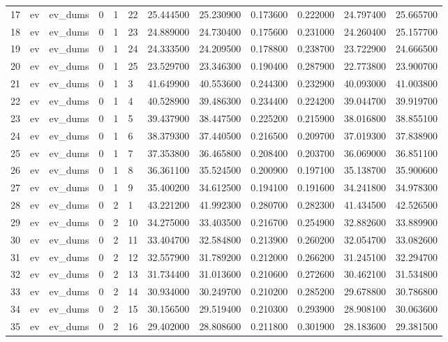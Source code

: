 \begin{tabular}{llllllrrrrrr}
17 & ev & ev_dums & 0 & 1 & 22 & 25.444500 & 25.230900 & 0.173600 & 0.222000 & 24.797400 & 25.665700 \\
18 & ev & ev_dums & 0 & 1 & 23 & 24.889000 & 24.730400 & 0.175600 & 0.231000 & 24.260400 & 25.157700 \\
19 & ev & ev_dums & 0 & 1 & 24 & 24.333500 & 24.209500 & 0.178800 & 0.238700 & 23.722900 & 24.666500 \\
20 & ev & ev_dums & 0 & 1 & 25 & 23.529700 & 23.346300 & 0.190400 & 0.287900 & 22.773800 & 23.900700 \\
21 & ev & ev_dums & 0 & 1 & 3 & 41.649900 & 40.553600 & 0.244300 & 0.232900 & 40.093000 & 41.003800 \\
22 & ev & ev_dums & 0 & 1 & 4 & 40.528900 & 39.486300 & 0.234400 & 0.224200 & 39.044700 & 39.919700 \\
23 & ev & ev_dums & 0 & 1 & 5 & 39.437900 & 38.447500 & 0.225200 & 0.215900 & 38.016800 & 38.855100 \\
24 & ev & ev_dums & 0 & 1 & 6 & 38.379300 & 37.440500 & 0.216500 & 0.209700 & 37.019300 & 37.838900 \\
25 & ev & ev_dums & 0 & 1 & 7 & 37.353800 & 36.465800 & 0.208400 & 0.203700 & 36.069000 & 36.851100 \\
26 & ev & ev_dums & 0 & 1 & 8 & 36.361100 & 35.524500 & 0.200900 & 0.197100 & 35.138700 & 35.900600 \\
27 & ev & ev_dums & 0 & 1 & 9 & 35.400200 & 34.612500 & 0.194100 & 0.191600 & 34.241800 & 34.978300 \\
28 & ev & ev_dums & 0 & 2 & 1 & 43.221200 & 41.992300 & 0.280700 & 0.282300 & 41.434500 & 42.526500 \\
29 & ev & ev_dums & 0 & 2 & 10 & 34.275000 & 33.403500 & 0.216700 & 0.254900 & 32.882600 & 33.889900 \\
30 & ev & ev_dums & 0 & 2 & 11 & 33.404700 & 32.584800 & 0.213900 & 0.260200 & 32.054700 & 33.082600 \\
31 & ev & ev_dums & 0 & 2 & 12 & 32.557900 & 31.789200 & 0.212000 & 0.266200 & 31.245100 & 32.294700 \\
32 & ev & ev_dums & 0 & 2 & 13 & 31.734400 & 31.013600 & 0.210600 & 0.272600 & 30.462100 & 31.534800 \\
33 & ev & ev_dums & 0 & 2 & 14 & 30.934000 & 30.249700 & 0.210200 & 0.285200 & 29.678800 & 30.786800 \\
34 & ev & ev_dums & 0 & 2 & 15 & 30.156500 & 29.519400 & 0.210300 & 0.293900 & 28.908100 & 30.063600 \\
35 & ev & ev_dums & 0 & 2 & 16 & 29.402000 & 28.808600 & 0.211800 & 0.301900 & 28.183600 & 29.381500 \\

\end{tabular}
